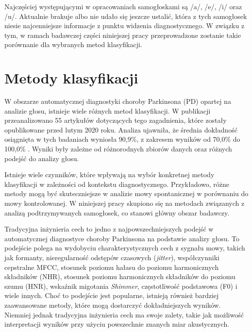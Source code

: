 Najczęściej występującymi w opracowaniach samogłoskami są /a/, /e/, /i/ oraz /u/.
Aktualnie brakuje albo nie udało się jeszcze ustalić, która z tych samogłosek niesie najcenniejsze informacje z punktu widzenia diagnostycznego.
W związku z tym, w ramach badawczej części niniejszej pracy przeprowadzone zostanie takie porównanie dla wybranych metod klasyfikacji.

\section{Metody klasyfikacji}\label{sec:metody-klasyfikacji}

W obszarze automatycznej diagnostyki choroby Parkinsona (PD) opartej na analizie głosu, istnieje wiele różnych metod klasyfikacji.
W publikacji~\cite{ML_for_PD_review} przeanalizowano 55 artykułów dotyczących tego zagadnienia, które zostały opublikowane przed lutym 2020 roku.
Analiza ujawniła, że średnia dokładność osiągnięta w tych badaniach wyniosła 90,9\%, z zakresem wyników od 70,0\%
\cite{7378178, multimodel-framework} do 100,0\% \cite{new-hybrid, fuzzy-neural-system, linear-discriminant-analysis, dastjerd}.
Wyniki były zależne od różnorodnych zbiorów danych oraz różnych podejść do analizy głosu.

Istnieje wiele czynników, które wpływają na wybór konkretnej metody klasyfikacji w zależności od kontekstu diagnostycznego.
Przykładowo, różne metody mogą być skuteczniejsze w analizie mowy spontanicznej w porównaniu do mowy kontrolowanej.
W niniejszej pracy skupiono się na metodach związanych z analizą podtrzymywanych samogłosek, co
stanowi główny obszar badawczy.

Tradycyjna inżynieria cech to jedno z najpowszechniejszych podejść w automatycznej diagnostyce choroby Parkinsona na podstawie analizy głosu.
To podejście polega na wydobyciu charakterystycznych cech z sygnału mowy, takich jak formanty, nieregularność odstępów czasowych (\emph{jitter}),
współczynniki cepstralne MFCC, stosunek poziomu hałasu do poziomu harmonicznych składników (NHR), stosunek poziomu harmonicznych składników
do poziomu szumu (HNR), wskaźnik migotania \emph{Shimmer}, częstotliwość podstawowa (F0) i wiele innych.
Choć to podejście jest popularne, istnieją również bardziej zaawansowane metody, które mogą dostarczyć dokładniejszych wyników.
Niemniej jednak tradycyjna inżynieria cech ma swoje zalety, takie jak możliwość interpretacji wyników przy użyciu powszechnie znanych miar akustycznych.

